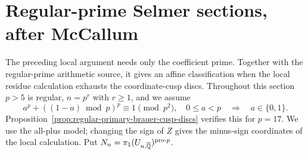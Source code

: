 \section{Regular-prime Selmer sections, after McCallum}
\label{sec:regular-prime-sections}

The preceding local argument needs only the coefficient prime.
Together with the regular-prime arithmetic source, it gives an
affine classification when the local residue calculation exhausts
the coordinate-cusp discs. Throughout this section $p>5$ is regular,
$n=p^r$ with $r\ge1$, and we assume
\begin{equation}\label{eq:regular-residue-condition}
 a^p+((1-a)\bmod p)^p\equiv1\pmod {p^2},\quad 0\le a<p
 \quad\Longrightarrow\quad a\in\{0,1\}.
\end{equation}
Proposition~\ref{prop:regular-primary-brauer-cusp-discs} verifies
this for $p=17$. We use the all-plus model; changing the sign of $Z$
gives the minus-sign coordinates of the local calculation. Put
$N_n=\pi_1(U_{n,\overline{\mathbb Q}})^{\mathrm{pro}\text{-}p}$.


